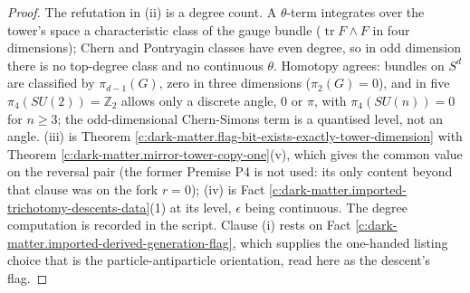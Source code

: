 \documentclass[11pt]{article}
\theoremstyle{definition}
\theoremstyle{plain}
\providecommand{\tr}{}\renewcommand{\tr}{\operatorname{tr}}
\begin{document}
\begin{proof}
The refutation in (ii) is a degree count. A $\theta$-term integrates over the tower's space a characteristic class of the gauge bundle ($\tr F \wedge F$ in four dimensions); Chern and Pontryagin classes have even degree, so in odd dimension there is no top-degree class and no continuous $\theta$. Homotopy agrees: bundles on $S^{d}$ are classified by $\pi_{d-1}(G)$, zero in three dimensions ($\pi_{2}(G) = 0$), and in five $\pi_{4}(SU(2)) = \mathbb{Z}_{2}$ allows only a discrete angle, $0$ or $\pi$, with $\pi_{4}(SU(n)) = 0$ for $n \geq 3$; the odd-dimensional Chern-Simons term is a quantised level, not an angle. (iii) is Theorem \ref{c:dark-matter.flag-bit-exists-exactly-tower-dimension} with Theorem \ref{c:dark-matter.mirror-tower-copy-one}(v), which gives the common value on the reversal pair (the former Premise P4 is not used: its only content beyond that clause was on the fork $r = 0$); (iv) is Fact \ref{c:dark-matter.imported-trichotomy-descents-data}(1) at its level, $\epsilon$ being continuous. The degree computation is recorded in the script. Clause (i) rests on Fact \ref{c:dark-matter.imported-derived-generation-flag}, which supplies the one-handed listing choice that is the particle-antiparticle orientation, read here as the descent's flag.

\end{proof}
\end{document}
